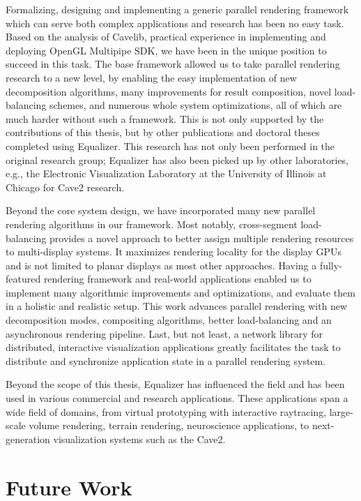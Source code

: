Formalizing, designing and implementing a generic parallel rendering framework
which can serve both complex applications and research has been no easy task.
Based on the analysis of Cavelib, practical experience in implementing and
deploying OpenGL Multipipe SDK, we have been in the unique position to succeed
in this task. The base framework allowed us to take parallel rendering research
to a new level, by enabling the easy implementation of new decomposition
algorithms, many improvements for result composition, novel load-balancing
schemes, and numerous whole system optimizations, all of which are much harder
without such a framework. This is not only supported by the contributions of
this thesis, but by other publications and doctoral theses completed using
Equalizer. This research has not only been performed in the original research
group; Equalizer has also been picked up by other laboratories, e.g., the
Electronic Visualization Laboratory at the University of Illinois at Chicago
for Cave2 research.

Beyond the core system design, we have incorporated many new parallel rendering
algorithms in our framework. Most notably, cross-segment load-balancing
provides a novel approach to better assign multiple rendering resources to
multi-display systems. It maximizes rendering locality for the display GPUs and
is not limited to planar displays as most other approaches. Having a
fully-featured rendering framework and real-world applications enabled us to
implement many algorithmic improvements and optimizations, and evaluate them in
a holistic and realistic setup. This work advances parallel rendering with new
decomposition modes, compositing algorithms, better load-balancing and an
asynchronous rendering pipeline. Last, but not least, a network library for
distributed, interactive visualization applications greatly facilitates the
task to distribute and synchronize application state in a parallel rendering
system.

Beyond the scope of this thesis, Equalizer has influenced the field and has
been used in various commercial and research applications. These applications
span a wide field of domains, from virtual prototyping with interactive
raytracing, large-scale volume rendering, terrain rendering, neuroscience
applications, to next-generation visualization systems such as the Cave2.

\section{Future Work}

